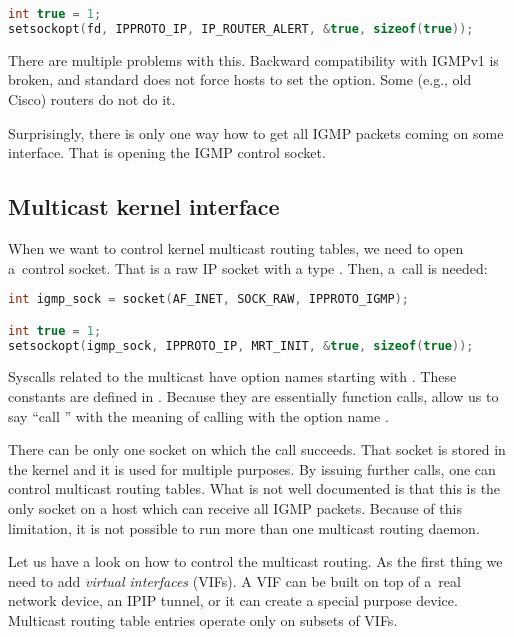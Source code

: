 \begin{lstlisting}[language=c]
int true = 1;
setsockopt(fd, IPPROTO_IP, IP_ROUTER_ALERT, &true, sizeof(true));
\end{lstlisting}

\noindent There are multiple problems with this. Backward compatibility with
IGMPv1 is broken, and standard does not force hosts to set the option. Some (e.g.,
old Cisco) routers do not do it.

Surprisingly, there is only one way how to get all IGMP packets coming on
some interface. That is opening the IGMP control socket.

\subsection{Multicast kernel interface}
\label{mcast-kernel}

When we want to control kernel multicast routing tables, we need to open
a~control socket. That is a raw IP socket with a type .
Then, a~\setsockopt call is needed:

\begin{lstlisting}[language=c]
int igmp_sock = socket(AF_INET, SOCK_RAW, IPPROTO_IGMP);

int true = 1;
setsockopt(igmp_sock, IPPROTO_IP, MRT_INIT, &true, sizeof(true));
\end{lstlisting}

\noindent Syscalls  related to the multicast have option names starting
with . These constants are defined in .
Because they are essentially function calls, allow us to say ``call
'' with the meaning of calling \setsockopt with the option
name .

There can be only one socket on which the call  succeeds. That socket
is stored in the kernel and it is used for multiple purposes. By issuing further
\setsockopt calls, one can control multicast routing tables. What is not well
documented is that this is the only socket on a host which can receive all IGMP
packets. Because of this limitation, it is not possible to run more than one
multicast routing daemon.

Let us have a look on how to control the multicast routing. As the first thing
we need to add \emph{virtual interfaces} (VIFs). A VIF can be built on top of
a~real network device, an IPIP tunnel, or it can create a special purpose device.
Multicast routing table entries operate only on subsets of VIFs.

